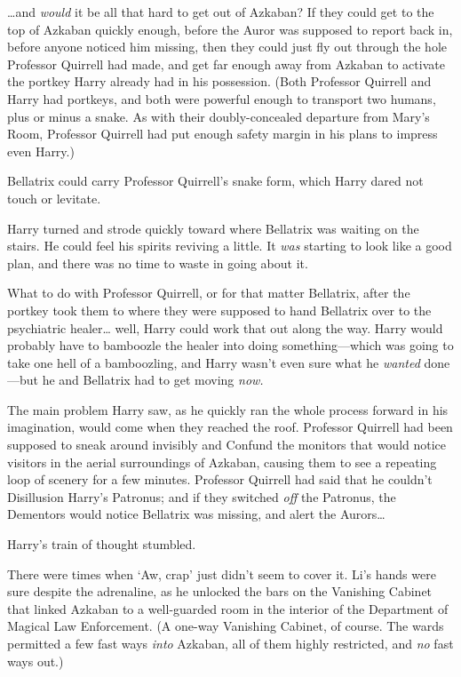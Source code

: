 {\ldots}and \emph{would} it be all that hard to get out of Azkaban? If they 
could get to the top of Azkaban quickly enough, before the Auror was supposed 
to report back in, before anyone noticed him missing, then they could just fly 
out through the hole Professor Quirrell had made, and get far enough away from 
Azkaban to activate the portkey Harry already had in his possession. (Both 
Professor Quirrell and Harry had portkeys, and both were powerful enough to 
transport two humans, plus or minus a snake. As with their doubly-concealed 
departure from Mary's Room, Professor Quirrell had put enough safety margin in 
his plans to impress even Harry.)

Bellatrix could carry Professor Quirrell's snake form, which Harry dared not 
touch or levitate.

Harry turned and strode quickly toward where Bellatrix was waiting on the 
stairs. He could feel his spirits reviving a little. It \emph{was} starting to 
look like a good plan, and there was no time to waste in going about it.

What to do with Professor Quirrell, or for that matter Bellatrix, after the 
portkey took them to where they were supposed to hand Bellatrix over to the 
psychiatric healer{\ldots} well, Harry could work that out along the way. Harry 
would probably have to bamboozle the healer into doing something---which was 
going to take one hell of a bamboozling, and Harry wasn't even sure what he 
\emph{wanted} done---but he and Bellatrix had to get moving \emph{now.}

The main problem Harry saw, as he quickly ran the whole process forward in his 
imagination, would come when they reached the roof. Professor Quirrell had been 
supposed to sneak around invisibly and Confund the monitors that would notice 
visitors in the aerial surroundings of Azkaban, causing them to see a repeating 
loop of scenery for a few minutes. Professor Quirrell had said that he couldn't 
Disillusion Harry's Patronus; and if they switched \emph{off} the Patronus, the 
Dementors would notice Bellatrix was missing, and alert the Aurors{\ldots}

Harry's train of thought stumbled.

There were times when `Aw, crap' just didn't seem to cover it.
\sbreak
Li's hands were sure despite the adrenaline, as he unlocked the bars on the 
Vanishing Cabinet that linked Azkaban to a well-guarded room in the interior of 
the Department of Magical Law Enforcement. (A one-way Vanishing Cabinet, of 
course. The wards permitted a few fast ways \emph{into} Azkaban, all of them 
highly restricted, and \emph{no} fast ways out.)


